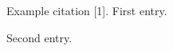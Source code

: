 \documentclass{article}
\begin{document}
\noindent\ttfamily Example citation [1].
\newpage
\noindent\ttfamily [1] First entry.\par
\noindent\ttfamily [2] Second entry.
\end{document}
